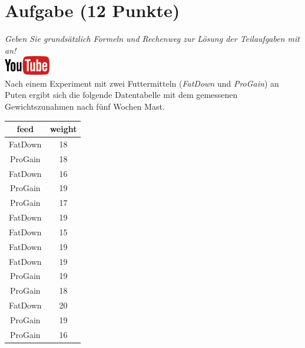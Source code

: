 \documentclass[a4paper, 10pt]{scrartcl}\usepackage[]{graphicx}\usepackage[]{xcolor}
\begin{document}
\section{Aufgabe \hfill (12 Punkte)}

\textit{Geben Sie grunds{\"a}tzlich Formeln und Rechenweg zur L{\"o}sung der
  Teilaufgaben mit an!} \\[1Ex]

\hfill\href{https://youtu.be/TbSEOMCQYl4}{\includegraphics[width =
  2cm]{img/youtube}}\\[1Ex]

Nach einem Experiment mit zwei Futtermitteln (\textit{FatDown} und
\textit{ProGain}) an Puten ergibt sich die folgende Datentabelle mit dem gemessenen
Gewichtszunahmen nach f{\"u}nf Wochen Mast.

\begin{table}[!h]
\centering
\begin{tabular}{cc}
\toprule
feed & weight\\
\midrule
FatDown & 18\\
ProGain & 18\\
FatDown & 16\\
ProGain & 19\\
ProGain & 17\\
\addlinespace
FatDown & 19\\
FatDown & 15\\
FatDown & 19\\
FatDown & 19\\
ProGain & 19\\
\addlinespace
ProGain & 18\\
FatDown & 20\\
ProGain & 19\\
ProGain & 16\\
\bottomrule
\end{tabular}
\end{table}
\end{document}
